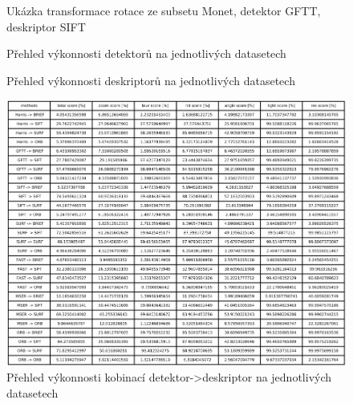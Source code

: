 \begin{figure}[htp] 
	\caption{Ukázka transformace rotace ze subsetu Monet, detektor GFTT, 
		deskriptor SIFT} \label{ex_MONET}
\end{figure}

\begin{figure}[htp] 
	\caption{Přehled výkonnosti detektorů na jednotlivých datasetech} \label{det_perf}
\end{figure}

\begin{figure}[htp] 
	\caption{Přehled výkonnosti deskriptorů na jednotlivých datasetech}	\label{desc_perf}
\end{figure}

\begin{figure}[htp] 
	\centering{}
		\includegraphics[scale=1]{text_img/Det_desc_perf.pdf}
	\caption{Přehled výkonnosti kobinací detektor->deskriptor na jednotlivých datasetech} \label{det_desc_perf}
\end{figure}

